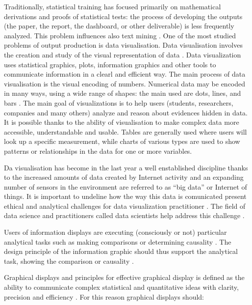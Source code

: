 \documentclass[]{book}
\begin{document}
Traditionally, statistical training has focused primarily on
mathematical derivations and proofs of statistical tests: the process of
developing the outputs (the paper, the report, the dashboard, or other
deliverable) is less frequently analyzed. This problem influences also
text mining \citep{parker2017opinionated}. One of the most studied
problems of output production is data visualisation. Data visualisation
involves the creation and study of the visual representation of data
\citep{friendly2001milestones}. Data visualization uses statistical
graphics, plots, information graphics and other tools to communicate
information in a clearl and efficient way. The main process of data
visualisation is the visual encoding of numbers. Numerical data may be
encoded in many ways, using a wide range of shapes: the main used are
dots, lines, and bars \citep{wickham2016ggplot2}. The main goal of
visualizations is to help users (students, researchers, companies and
many others) analyze and reason about evidences hidden in data. It is
possible thanks to the ability of visualisation to make complex data
more accessible, understandable and usable. Tables are generally used
where users will look up a specific measurement, while charts of various
types are used to show patterns or relationships in the data for one or
more variables.

Da visualisation has become in the last year a well enstablished
discipline thanks to the increased amounts of data created by Internet
activity and an expanding number of sensors in the environment are
referred to as ``big data'' or Internet of things. It is important to
undeline how the way this data is comunicated present ethical and
analytical challenges for data visualization practitioner
\citep{bikakis2018big}. The field of data science and practitioners
called data scientists help address this challenge
\citep{loukides2011data}.

Users of information displays are executing (consciously or not)
particular analytical tasks such as making comparisons or determining
causality \citep{tufte1990envisioning}. The design principle of the
information graphic should thus support the analytical task, showing the
comparison or causality \citep{tufte2006beautiful}.

Graphical displays and principles for effective graphical display is
defined as the ability to communicate complex statistical and
quantitative ideas with clarity, precision and efficiency
\citep{mulrow2002visual}. For this reason graphical displays should:
\end{document}
